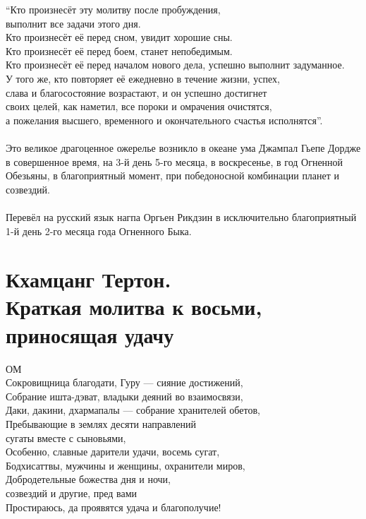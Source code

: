 “Кто произнесёт эту молитву после пробуждения, \\ \indent выполнит все задачи этого дня.\\
Кто произнесёт её перед сном, увидит хорошие сны.\\
Кто произнесёт её перед боем, станет непобедимым.\\
Кто произнесёт её перед началом нового дела, успешно выполнит задуманное.\\
У того же, кто повторяет её ежедневно в течение жизни, успех,\\
слава и благосостояние возрастают, и он успешно достигнет\\
своих целей, как наметил, все пороки и омрачения очистятся,\\
а пожелания высшего, временного и окончательного счастья исполнятся”.\\
\\
Это великое драгоценное ожерелье возникло в океане ума
Джампал Гьепе Дордже в совершенное время, на 3-й день
5-го месяца, в воскресенье, в год Огненной Обезьяны,
в благоприятный момент, при победоносной комбинации планет и созвездий.\\
\\
Перевёл на русский язык нагпа Оргьен Рикдзин
в исключительно благоприятный 1-й день 2-го месяца года Огненного Быка.
\normalsize
\newpage
\section{Кхамцанг Тертон.\\Краткая молитва к восьми, \\приносящая удачу}
ОМ\\
Сокровищница благодати, Гуру — сияние достижений,\\
Собрание ишта-дэват, владыки деяний во взаимосвязи,\\
Даки, дакини, дхармапалы — собрание хранителей обетов,\\
Пребывающие в землях десяти направлений \\ \indent сугаты вместе с сыновьями,\\
Особенно, славные дарители удачи, восемь сугат,\\
Бодхисаттвы, мужчины и женщины, охранители миров,\\
Добродетельные божества дня и ночи, \\ \indent созвездий и другие, пред вами\\
Простираюсь, да проявятся удача и благополучие!\\

